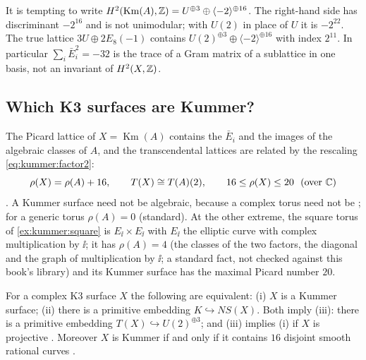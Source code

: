 \begin{pitfallbox}[$22=6+16$ is not a lattice decomposition]
It is tempting to write $H^2(\operatorname{Km}(A),\mathbb{Z})=U^{\oplus3}\oplus
\langle-2\rangle^{\oplus16}$. The right-hand side has discriminant $-2^{16}$ and is not
unimodular; with $U(2)$ in place of $U$ it is $-2^{22}$. The true lattice
$3U\oplus2E_8(-1)$ contains $U(2)^{\oplus3}\oplus\langle-2\rangle^{\oplus16}$ with index
$2^{11}$. In particular $\sum_i\bar E_i^2=-32$ is the trace of a Gram matrix of a sublattice in
one basis, not an invariant of $H^2(X,\mathbb{Z})$.
\end{pitfallbox}

\subsection{Which K3 surfaces are Kummer?}

The Picard lattice of $X=\operatorname{Km}(A)$ contains the $\bar E_i$ and the images of the
algebraic classes of $A$, and the transcendental lattices are related by the rescaling
\eqref{eq:kummer:factor2}:
\begin{equation}\label{eq:kummer:rho}
  \rho(X)=\rho(A)+16,\index{Picard number!of a Kummer surface}\qquad T(X)\cong T(A)(2),\qquad 16\le\rho(X)\le20\ \ (\text{over }\C)
\end{equation}
. A Kummer surface need not be
algebraic, because a complex torus need not be ; for a generic
torus $\rho(A)=0$ (standard). At the other extreme, the square torus of \cref{ex:kummer:square} is
$E_{\ii}\times E_{\ii}$ with $E_{\ii}$ the elliptic curve with complex multiplication by
$\ii$; it has $\rho(A)=4$ (the classes of the two factors, the diagonal and the graph of
multiplication by $\ii$; a standard fact, not checked against this book's library) and its
Kummer surface has the maximal Picard number $20$.

\begin{theorem}[Nikulin; \TL]\label{thm:kummer:nikulin}
For a complex K3 surface $X$ the following are equivalent: (i) $X$ is a Kummer surface;
(ii) there is a primitive embedding $K\hookrightarrow NS(X)$. Both imply (iii): there is a
primitive embedding $T(X)\hookrightarrow U(2)^{\oplus3}$; and (iii) implies (i) if $X$ is
projective . Moreover $X$ is Kummer if and only
if it contains $16$ disjoint smooth rational curves .
\end{theorem}

